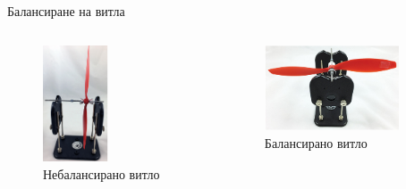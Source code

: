 \documentclass{beamer}
\begin{document}
\begin{frame}{Балансиране на витла}
	\begin{columns}
		\pause
	\begin{figure}[htpb!]
		\centering
		\includegraphics[width=0.5\textwidth]{Images/prop_on_balance.png}
		\caption{Небалансирано витло}
	\end{figure}



	\pause
		\begin{figure}[htpb!]
		\centering
		\includegraphics[width=0.85\textwidth]{Images/prop_balanced.png}
		\caption{Балансирано витло}
	\end{figure}
\end{columns}
\end{frame}
\end{document}
